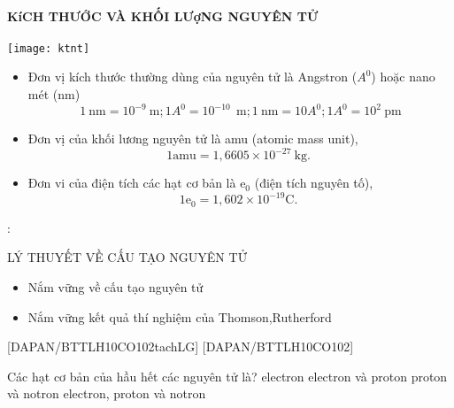 \paragraph{KíCH THƯỚC VÀ KHỐI LƯợNG NGUYÊN TỬ}
\begin{center}
	\texttt{[image: ktnt]}\\
	\label{fig:hinh7}
\end{center}
\begin{notegsnd}
		\begin{itemize}
\item Đơn vị kích thước thường dùng của nguyên tử là Angstron ($ A^0 $) hoặc nano mét (nm)			
	$$1 \mathrm{~nm}=10^{-9}~\mathrm{m} ; 1 A^0=10^{-10}~\mathrm{~m} ; 1 \mathrm{~nm}=10 A^0; 1 A^0=10^{2}~\mathrm{pm}$$
	\begin{center}
	\end{center}
		\item Đơn vị của khối lương nguyên tử là amu (atomic mass unit),
		$$
		1 \mathrm{amu}=1,6605 \times 10^{-27} \mathrm{~kg} \text {. }
		$$
		\item Đơn vi của điện tích các hạt cơ bản là $\mathrm{e}_0$ (điện tích nguyên tố),
		$$
		1 \mathrm{e}_0=1,602 \times 10^{-19} \mathrm{C} \text {. }
		$$
	\end{itemize}
\end{notegsnd}
\newpage
\vspace*{3pt}

:
\begin{dangntd}{LÝ THUYẾT VỀ CẤU TẠO NGUYÊN TỬ}
\begin{itemize}
	\item Nắm vững về cấu tạo nguyên tử
	\item Nắm vững kết quả thí nghiệm của Thomson,Rutherford
\end{itemize}
\end{dangntd}
[DAPAN/BTTLH10CO102tachLG]
[DAPAN/BTTLH10CO102]
\begin{ex}[1]
	Các hạt cơ bản của hầu hết các nguyên tử là?
	\choice
{%
electron
}
{%
	electron và proton
}
{%
 proton và notron
}
{%
\True electron, proton và notron
}
\huongdan{

}
\end{ex}


